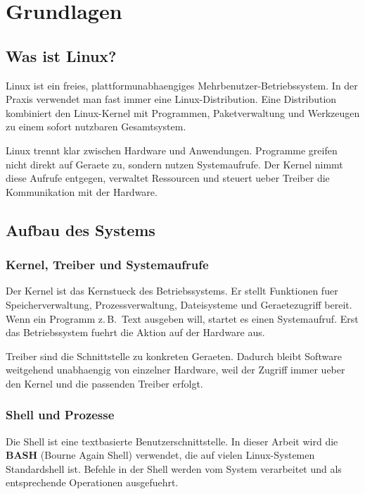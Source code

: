 \documentclass[11pt, oneside, numbers=noenddot]{scrbook}
\begin{document}

\tableofcontents
{}		



\chapter{Grundlagen}

\section{Was ist Linux?}
Linux ist ein freies, plattformunabhaengiges Mehrbenutzer-Betriebssystem. In der Praxis verwendet man fast immer eine Linux-Distribution. Eine Distribution kombiniert den Linux-Kernel mit Programmen, Paketverwaltung und Werkzeugen zu einem sofort nutzbaren Gesamtsystem.

Linux trennt klar zwischen Hardware und Anwendungen. Programme greifen nicht direkt auf Geraete zu, sondern nutzen Systemaufrufe. Der Kernel nimmt diese Aufrufe entgegen, verwaltet Ressourcen und steuert ueber Treiber die Kommunikation mit der Hardware.

\section{Aufbau des Systems}
\subsection{Kernel, Treiber und Systemaufrufe}
Der Kernel ist das Kernstueck des Betriebssystems. Er stellt Funktionen fuer Speicherverwaltung, Prozessverwaltung, Dateisysteme und Geraetezugriff bereit. Wenn ein Programm z.\,B.\ Text ausgeben will, startet es einen Systemaufruf. Erst das Betriebssystem fuehrt die Aktion auf der Hardware aus.

Treiber sind die Schnittstelle zu konkreten Geraeten. Dadurch bleibt Software weitgehend unabhaengig von einzelner Hardware, weil der Zugriff immer ueber den Kernel und die passenden Treiber erfolgt.
\newpage
\subsection{Shell und Prozesse}
Die Shell ist eine textbasierte Benutzerschnittstelle. In dieser Arbeit wird die \textbf{BASH} (Bourne Again Shell) verwendet, die auf vielen Linux-Systemen Standardshell ist. Befehle in der Shell werden vom System verarbeitet und als entsprechende Operationen ausgefuehrt.
\end{document}
